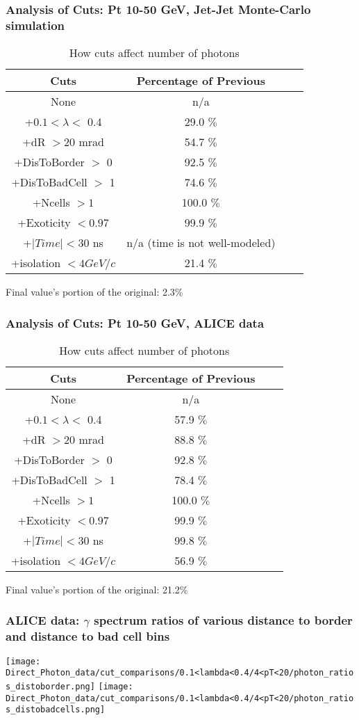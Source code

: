 \documentclass{beamer}
\begin{document}
\frame 
{ 
\frametitle{Analysis of Cuts: Pt 10-50 GeV, Jet-Jet Monte-Carlo simulation} 
\begin{table} 
\caption{How cuts affect number of photons} 
\centering 
\begin{tabular}{c c c c} 
\hline\hline 
Cuts & Percentage of Previous\\ [0.5ex] 
\hline
None & n/a\\
+$0.1 < \lambda <$ 0.4 & 29.0 $\%$ \\
+dR $> 20$ mrad & 54.7 $\%$ \\
+DisToBorder $>$ 0 & 92.5 $\%$ \\
+DisToBadCell $>$ 1 & 74.6 $\%$ \\
+Ncells $> 1$ & 100.0 $\%$ \\
+Exoticity $< 0.97$ & 99.9 $\%$ \\
+$|Time| < 30$ ns & n/a (time is not well-modeled)  \\
+isolation $< 4 GeV/c$ & 21.4 $\%$ \\
[1ex] 
\hline 
\end{tabular} 
\label{table:nonlin} 
\end{table} 
 Final value's portion of the original: 2.3\%
 } 

\frame 
{ 
\frametitle{Analysis of Cuts: Pt 10-50 GeV, ALICE data } 
\begin{table} 
\caption{How cuts affect number of photons} 
\centering 
\begin{tabular}{c c c c} 
\hline\hline 
Cuts & Percentage of Previous\\ [0.5ex] 
\hline
None & n/a\\
+$0.1 < \lambda <$ 0.4 & 57.9 $\%$ \\
+dR $> 20$ mrad & 88.8 $\%$ \\
+DisToBorder $>$ 0 & 92.8 $\%$ \\
+DisToBadCell $>$ 1 & 78.4 $\%$ \\
+Ncells $> 1$ & 100.0 $\%$ \\
+Exoticity $< 0.97$ & 99.9 $\%$ \\
+$|Time| < 30$ ns & 99.8 $\%$ \\
+isolation $< 4 GeV/c$ & 56.9 $\%$ \\
[1ex] 
\hline 
\end{tabular} 
\label{table:nonlin} 
\end{table} 
 Final value's portion of the original: 21.2\%
 } 

\frame
{
	\frametitle{ALICE data: $\gamma$ spectrum ratios of various distance to border and distance to bad cell bins}
	\texttt{[image: Direct\_Photon\_data/cut\_comparisons/0.1<lambda<0.4/4<pT<20/photon\_ratios\_distoborder.png]}
	\texttt{[image: Direct\_Photon\_data/cut\_comparisons/0.1<lambda<0.4/4<pT<20/photon\_ratios\_distobadcells.png]}
}
\end{document}
